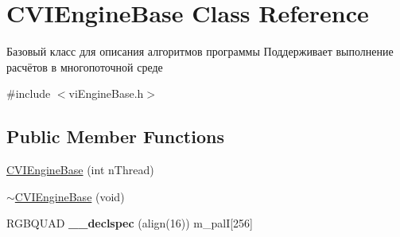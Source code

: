 \hypertarget{class_c_v_i_engine_base}{\section{C\+V\+I\+Engine\+Base Class Reference}
\label{class_c_v_i_engine_base}
}


Базовый класс для описания алгоритмов программы Поддерживает выполнение расчётов в многопоточной среде  




{\ttfamily \#include $<$vi\+Engine\+Base.\+h$>$}

\subsection*{Public Member Functions}
\begin{DoxyCompactItemize}
\item 
\hyperlink{class_c_v_i_engine_base_a1349de29adc90869f463b17fb03904c1}{C\+V\+I\+Engine\+Base} (int n\+Thread)
\item 
\hyperlink{class_c_v_i_engine_base_a28dba2a06eda33294836c5241f497112}{$\sim$\+C\+V\+I\+Engine\+Base} (void)
\item 
\hypertarget{class_c_v_i_engine_base_acd0542a6476a6eed4568c900ab5af5d9}{R\+G\+B\+Q\+U\+A\+D {\bfseries \+\_\+\+\_\+declspec} (align(16)) m\+\_\+pal\+I\mbox{[}256\mbox{]}}\label{class_c_v_i_engine_base_acd0542a6476a6eed4568c900ab5af5d9}


\end{DoxyCompactItemize}
